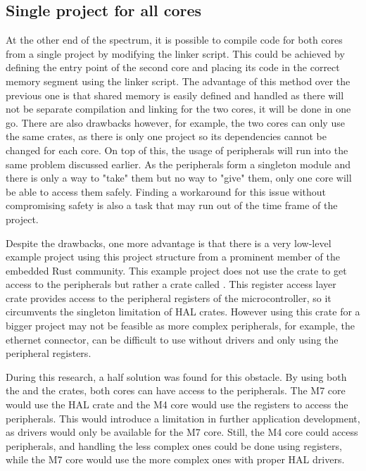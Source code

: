 \subsection{Single project for all cores}

At the other end of the spectrum, it is possible to compile code for both cores from a single project by modifying the linker script. This could be achieved by defining the entry point of the second core and placing its code in the correct memory segment using the  linker script. The advantage of this method over the previous one is that shared memory is easily defined and handled as there will not be separate compilation and linking for the two cores, it will be done in one go. There are also drawbacks however, for example, the two cores can only use the same crates, as there is only one project so its dependencies cannot be changed for each core. On top of this, the usage of peripherals will run into the same problem discussed earlier. As the peripherals form a singleton module and there is only a way to "take" them but no way to "give" them, only one core will be able to access them safely. Finding a workaround for this issue without compromising safety is also a task that may run out of the time frame of the project.

Despite the drawbacks, one more advantage is that there is a very low-level example project using this project structure from a prominent member of the embedded Rust community. \cite{DualCoreDemo} This example project does not use the  crate to get access to the peripherals but rather a crate called . This register access layer crate provides access to the peripheral registers of the microcontroller, so it circumvents the singleton limitation of HAL crates. However using this crate for a bigger project may not be feasible as more complex peripherals, for example, the ethernet connector, can be difficult to use without drivers and only using the peripheral registers.

During this research, a half solution was found for this obstacle. By using both the  and the  crates, both cores can have access to the peripherals. The M7 core would use the HAL crate and the M4 core would use the registers to access the peripherals. This would introduce a limitation in further application development, as drivers would only be available for the M7 core. Still, the M4 core could access peripherals, and handling the less complex ones could be done using registers, while the M7 core would use the more complex ones with proper HAL drivers.

